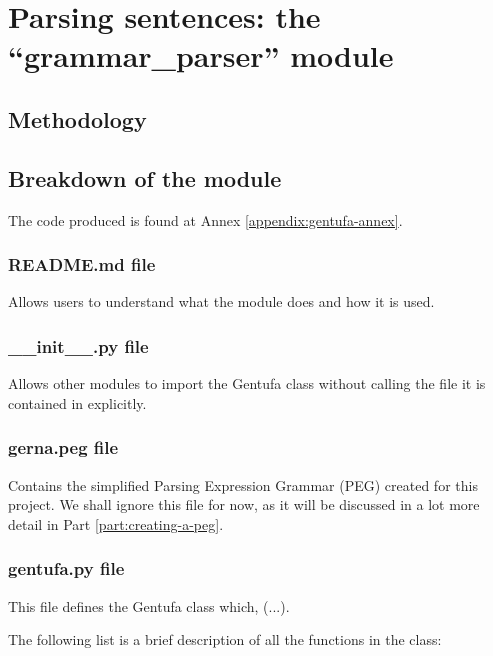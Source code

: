 \chapter{Parsing sentences: the ``grammar\_parser'' module}
\label{chap:parser}

\section{Methodology}


\section{Breakdown of the module}
\label{sec:parsing_lojban_sentences}

The code produced is found at Annex \ref{appendix:gentufa-annex}.

\subsection*{README.md file}

Allows users to understand what the module does and how it is used.

\subsection*{\_\_init\_\_.py file}

Allows other modules to import the Gentufa class without calling the file it is contained in explicitly.

\subsection*{gerna.peg file}

Contains the simplified Parsing Expression Grammar (PEG) created for this project.
We shall ignore this file for now, as it will be discussed in a lot more detail in Part \ref{part:creating-a-peg}.

\subsection*{gentufa.py file}

This file defines the Gentufa class which, (...).\newline

\newpage

The following list is a brief description of all the
functions in the class:

